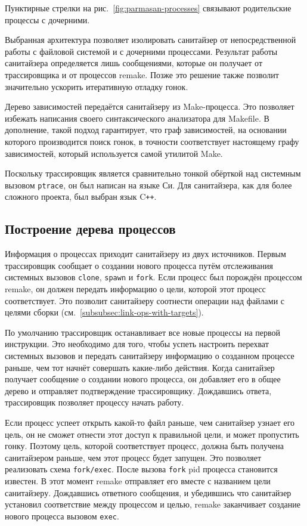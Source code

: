 Пунктирные стрелки на рис.~\ref{fig:parmasan-processes} связывают родительские процессы с дочерними.

Выбранная архитектура позволяет изолировать санитайзер от непосредственной работы с файловой системой и с дочерними процессами. Результат работы санитайзера определяется лишь сообщениями, которые он получает от трассировщика и от процессов remake. Позже это решение также позволит значительно ускорить итеративную отладку гонок.

Дерево зависимостей передаётся санитайзеру из Make-процесса. Это позволяет избежать написания своего синтаксического анализатора для Makefile. В дополнение, такой подход гарантирует, что граф зависимостей, на основании которого производится поиск гонок, в точности соответствует настоящему графу зависимостей, который используется самой утилитой Make.

Поскольку трассировщик является сравнительно тонкой обёрткой над системным вызовом \texttt{ptrace}, он был написан на языке Си. Для санитайзера, как для более сложного проекта, был выбран язык C\texttt{++}.

\subsection{Построение дерева процессов}
Информация о процессах приходит санитайзеру из двух источников. Первым трассировщик сообщает о создании нового процесса путём отслеживания системных вызовов \texttt{clone}, \texttt{spawn} и \texttt{fork}. Если процесс был порождён процессом remake, он должен передать информацию о цели, которой этот процесс соответствует. Это позволит санитайзеру соотнести операции над файлами с целями сборки (см.~\ref{subsubsec:link-ops-with-targets}).

По умолчанию трассировщик останавливает все новые процессы на первой инструкции. Это необходимо для того, чтобы успеть настроить перехват системных вызовов и передать санитайзеру информацию о созданном процессе раньше, чем тот начнёт совершать какие-либо действия. Когда санитайзер получает сообщение о создании нового процесса, он добавляет его в общее дерево и отправляет подтверждение трассировщику. Дождавшись ответа, трассировщик позволяет процессу начать работу.

Если процесс успеет открыть какой-то файл раньше, чем санитайзер узнает его цель, он не сможет отнести этот доступ к правильной цели, и может пропустить гонку. Поэтому цель, которой соответствует процесс, должна быть получена санитайзером раньше, чем этот процесс будет запущен. Это позволяет реализовать схема \texttt{fork/exec}. После вызова \texttt{fork} pid процесса становится известен. В этот момент remake отправляет его вместе с названием цели санитайзеру. Дождавшись ответного сообщения, и убедившись что санитайзер установил соответствие между процессом и целью, remake заканчивает создание нового процесса вызовом \texttt{exec}.

